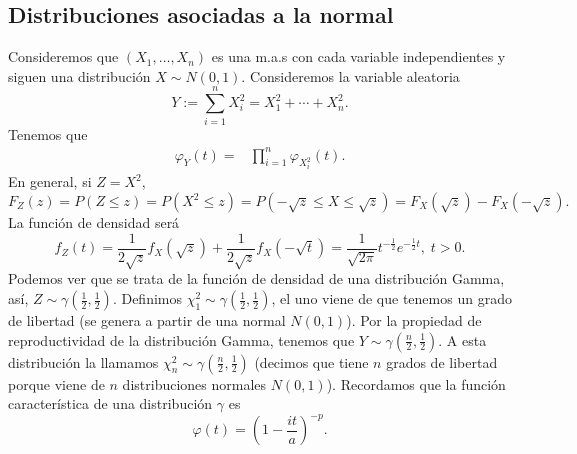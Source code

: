 \subsection*{Distribuciones asociadas a la normal}
Consideremos que $\displaystyle \left(X_{1}, \ldots, X_{n}\right) $ es una m.a.s con cada variable independientes y siguen una distribución $\displaystyle X \sim N\left(0,1\right) $. Consideremos la variable aleatoria
\[Y := \sum^{n}_{i = 1}X^{2}_{i} = X^{2}_{1} + \cdots + X^{2}_{n} .\]
Tenemos que 
\[
\begin{split}
	\varphi_{Y}\left(t\right) = & \prod^{n}_{i = 1}\varphi_{X_{i}^{2}}\left(t\right) .
\end{split}
\]
En general, si $\displaystyle Z = X^{2} $, 
\[F_{Z}\left(z\right) = P\left(Z \leq z\right) = P\left(X^{2} \leq z\right) = P\left(-\sqrt{z} \leq X \leq \sqrt{z}\right) = F_{X}\left(\sqrt{z}\right) - F_{X}\left(-\sqrt{z}\right) .\]
La función de densidad será
\[f_{Z}\left(t\right) = \frac{1}{2\sqrt{z}}f_{X}\left(\sqrt{z}\right) + \frac{1}{2\sqrt{z}}f_{X}\left(-\sqrt{t}\right) = \frac{1}{\sqrt{2\pi }} t ^{-\frac{1}{2}}e^{-\frac{1}{2}t}, \; t > 0 .\]
Podemos ver que se trata de la función de densidad de una distribución Gamma, así, $\displaystyle Z \sim \gamma\left(\frac{1}{2}, \frac{1}{2}\right) $. Definimos $\displaystyle \chi^{2}_{1} \sim \gamma\left(\frac{1}{2}, \frac{1}{2}\right) $, el uno viene de que tenemos un grado de libertad (se genera a partir de una normal $\displaystyle N\left(0,1\right) $). Por la propiedad de reproductividad de la distribución Gamma, tenemos que $\displaystyle Y \sim \gamma\left(\frac{n}{2}, \frac{1}{2}\right) $. A esta distribución la llamamos $\displaystyle \chi_{n}^{2}\sim \gamma\left(\frac{n}{2}, \frac{1}{2}\right) $ (decimos que tiene $\displaystyle n $ grados de libertad porque viene de $\displaystyle n $ distribuciones normales $\displaystyle N\left(0,1\right) $). 
Recordamos que la función característica de una distribución $\displaystyle \gamma  $ es
\[\varphi\left(t\right)= \left(1 - \frac{it}{a}\right)^{-p} .\]

